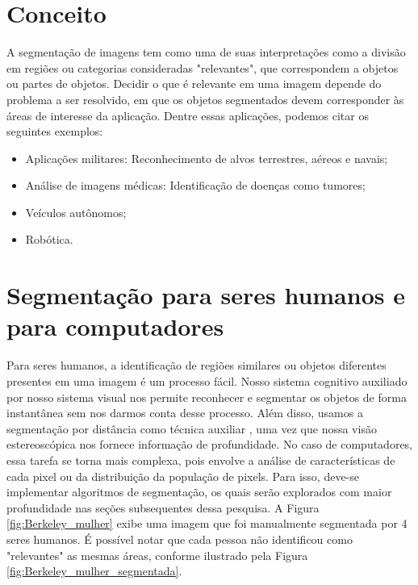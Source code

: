 \section{Conceito}
A segmentação de imagens tem como uma de suas interpretações como a divisão em regiões ou categorias consideradas "relevantes", que correspondem a objetos ou partes de objetos. Decidir o que é relevante em uma imagem depende do problema a ser resolvido, em que os objetos segmentados devem corresponder às áreas de interesse da aplicação. Dentre essas aplicações, podemos citar os seguintes exemplos:

\begin{itemize}
\item Aplicações militares: Reconhecimento de alvos terrestres, aéreos e navais;
\item Análise de imagens médicas: Identificação de doenças como tumores;
\item Veículos autônomos;
\item Robótica.
\end{itemize}

\section{Segmentação para seres humanos e para computadores}\label{sec:segmenthm}
Para seres humanos, a identificação de regiões similares ou objetos diferentes presentes em uma imagem é um processo fácil. Nosso sistema cognitivo auxiliado por nosso sistema visual nos permite reconhecer e segmentar os objetos de forma instantânea sem nos darmos conta desse processo. Além disso, usamos a segmentação por distância como técnica auxiliar , uma vez que nossa visão estereoscópica nos fornece informação de profundidade.
No caso de computadores, essa tarefa se torna mais complexa, pois envolve a análise de características de cada pixel ou da distribuição da população de pixels. Para isso, deve-se implementar algoritmos de segmentação, os quais serão explorados com maior profundidade nas seções subsequentes dessa pesquisa. A Figura \ref{fig:Berkeley_mulher} exibe uma imagem que foi manualmente segmentada por 4 seres humanos. É possível notar que cada pessoa não identificou como "relevantes" as mesmas áreas, conforme ilustrado pela Figura \ref{fig:Berkeley_mulher_segmentada}. 

